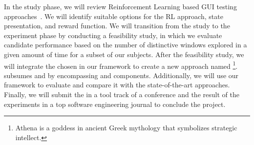 \noindent
In the study phase, we will review Reinforcement Learning based  GUI testing approaches~\cite{Mariani:GUI:STVR:2014,Vuong:RLTest:A-Test:2018,Pan:QTesting:ISSTA:2020,Romdhana:ARES:TOSEM:2022}. 
We will identify suitable options for the RL approach, state presentation, and reward function.
We will transition from the study to the experiment phase by  conducting a feasibility study, in which we evaluate candidate \rlaganets performance based on the number of distinctive windows  explored in a given amount of time for a subset of our subjects. 
After the feasibility study, we will  integrate the chosen \rlaganet in our framework to create a new \testreuse approach named \rltool\footnote{Athena is a goddess in ancient Greek mythology that symbolizes strategic intellect.
}.
\rltool subsumes \visiontool and \llmtool by  encompassing \imagelabeler and \llmtranslator components.
Additionally, we will use our \tme framework to evaluate \rltool and compare it with the state-of-the-art \testreuse approaches.
Finally, we will submit the \rltool in a tool track of a conference and the result of the \testreuse experiments in a top software  engineering journal to conclude the project. 
















